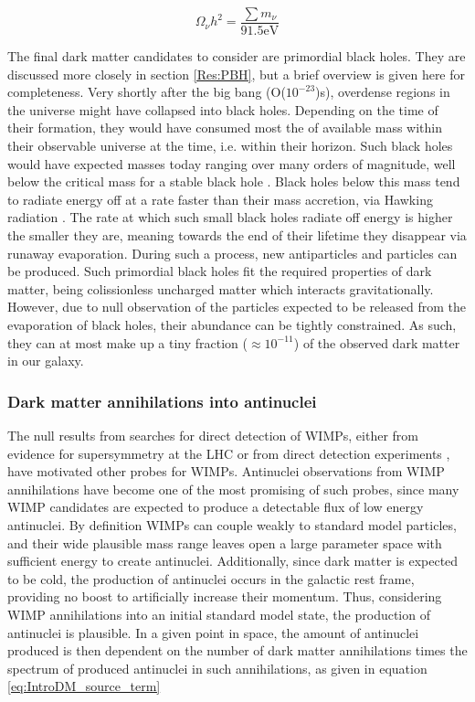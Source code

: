 \begin{equation}\label{eq:NeutrinoAbundance}
    \Omega_\nu h^2 = \frac{\sum m_\nu}{91.5 \mathrm{eV}}
\end{equation}

The final dark matter candidates to consider are primordial black holes. They are discussed more closely in section \ref{Res:PBH}, but a brief overview is given here for completeness. Very shortly after the big bang (O($10^{-23}$)s), overdense regions in the universe might have collapsed into black holes. Depending on the time of their formation, they would have consumed most the of available mass within their observable universe at the time, i.e. within their horizon. Such black holes would have expected masses today ranging over many orders of magnitude, well below the critical mass for a stable black hole \cite{HAWKING1974}. Black holes below this mass tend to radiate energy off at a rate faster than their mass accretion, via Hawking radiation \cite{VISSER_2003, HAWKING1974}. The rate at which such small black holes radiate off energy is higher the smaller they are, meaning towards the end of their lifetime they disappear via runaway evaporation. During such a process, new antiparticles and particles can be produced. Such primordial black holes fit the required properties of dark matter, being colissionless uncharged matter which interacts gravitationally. However, due to null observation of the particles expected to be released from the evaporation of black holes, their abundance can be tightly constrained. As such, they can at most make up a tiny fraction ($\approx 10^{-11}$) of the observed dark matter in our galaxy.

\subsubsection{Dark matter annihilations into antinuclei}
The null results from searches for direct detection of WIMPs, either from evidence for supersymmetry at the LHC or from direct detection experiments \cite{XENON2, Lux}, have motivated other probes for WIMPs. Antinuclei observations from WIMP annihilations have become one of the most promising of such probes, since many WIMP candidates are expected to produce a detectable flux of low energy antinuclei\cite{Ibarra:2012cc, Korsmeier:2017xzj}. By definition WIMPs can couple weakly to standard model particles, and their wide plausible mass range leaves open a large parameter space with sufficient energy to create antinuclei. Additionally, since dark matter is expected to be cold, the production of antinuclei occurs in the galactic rest frame, providing no boost to artificially increase their momentum. Thus, considering WIMP annihilations into an initial standard model state, the production of antinuclei is plausible. In a given point in space, the amount of antinuclei produced is then dependent on the number of dark matter annihilations times the spectrum of produced antinuclei in such annihilations, as given in equation \ref{eq:IntroDM_source_term}

